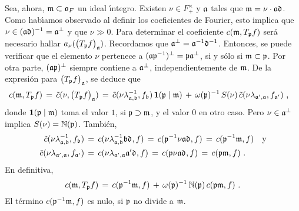 Sea, ahora, $\frak{m}\subset\oka{F}$ un ideal \'{\i}ntegro. Existen
$\nu\in F^{\times}_{+}$ y $\frak{a}$ tales que
$\frak{m}=\nu\cdot\frak{a}\diferente$. Como hab\'{\i}amos observado al definir
los coeficientes de Fourier, esto implica que
$\nu\in (\frak{a}\diferente)^{-1}=\frak{a}^{\perp}$ y que $\nu\gg 0$. Para
determinar el coeficiente $c(\frak{m},T_{\frak{p}}f)$ ser\'{a} necesario hallar
$a_{\nu}(\big(T_{\frak{p}}f\big)_{\frak{a}})$. Recordamos que
$\frak{a}^{\perp}=\frak{a}^{-1}\diferente^{-1}$. Entonces, se puede verificar
que el elemento $\nu$ pertenece a
$(\frak{a}\frak{p}^{-1})^{\perp}=\frak{p}\frak{a}^{\perp}$, si y s\'{o}lo si
$\frak{m}\subset\frak{p}$. Por otra parte, $(\frak{a}\frak{p})^{\perp}$ siempre
contiene a $\frak{a}^{\perp}$, independientemente de $\frak{m}$. De la
expresi\'{o}n para $\big(T_{\frak{p}}f\big)_{\frak{a}}$, se deduce que
\begin{align*}
	c(\frak{m},T_{\frak{p}}f) & \,=\,
		\tilde{c}(\nu,\big(T_{\frak{p}}f\big)_{\frak{a}}) \,=\,
		\tilde{c}(\nu\lambda_{\frak{a},\frak{b}}^{-1},f_{\frak{b}})\,
			\indica(\frak{p}\mid\frak{m})
		\,+\,\omega(\frak{p})^{-1}\,S(\nu)\,
		\tilde{c}(\nu\lambda_{\frak{a}',\frak{a}},f_{\frak{a}'})
	\text{ ,}
\end{align*}
%
donde $\indica(\frak{p}\mid\frak{m})$ toma el valor $1$, si
$\frak{p}\supset\frak{m}$, y el valor $0$ en otro caso. Pero
$\nu\in\frak{a}^{\perp}$ implica $S(\nu)=\idnorm(\frak{p})$. Tambi\'{e}n,
\begin{align*}
	\tilde{c}(\nu\lambda_{\frak{a},\frak{b}}^{-1},f_{\frak{b}}) & \,=\,
		c(\nu\lambda_{\frak{a},\frak{b}}^{-1}\frak{b}\diferente,f)\,=\,
		c(\frak{p}^{-1}\nu\frak{a}\diferente,f)\,=\,
		c(\frak{p}^{-1}\frak{m},f) \quad\text{y} \\
	\tilde{c}(\nu\lambda_{\frak{a}',\frak{a}},f_{\frak{a}'}) & \,=\,
		c(\nu\lambda_{\frak{a}',\frak{a}}\frak{a}'\diferente,f)\,=\,
		c(\frak{p}\nu\frak{a}\diferente,f)\,=\,
		c(\frak{p}\frak{m},f)
	\text{ .}
\end{align*}
%
En definitiva,
\begin{equation}
	\label{eq:heckeenloscoeficientes}
	c(\frak{m},T_{\frak{p}}f) \,=\,c(\frak{p}^{-1}\frak{m},f)\,+\,
		\omega(\frak{p})^{-1}\,\idnorm(\frak{p})\,
		c(\frak{p}\frak{m},f)
	\text{ .}
\end{equation}
%
El t\'{e}rmino $c(\frak{p}^{-1}\frak{m},f)$ es nulo, si $\frak{p}$ no divide a
$\frak{m}$.%
